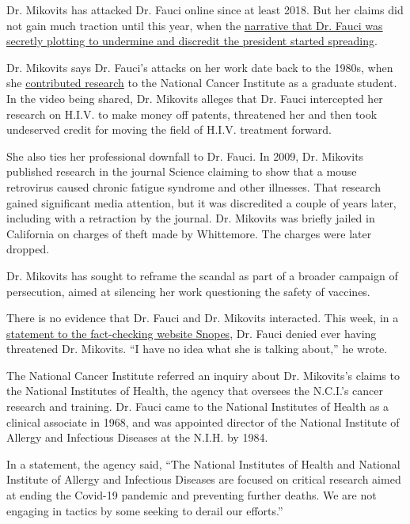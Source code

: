 Dr. Mikovits has attacked Dr. Fauci online since at least 2018. But her
claims did not gain much traction until this year, when the
\href{https://www.nytimes.com/2020/03/28/technology/coronavirus-fauci-trump-conspiracy-target.html}{narrative
that Dr. Fauci was secretly plotting to undermine and discredit the
president started spreading}.

Dr. Mikovits says Dr. Fauci's attacks on her work date back to the
1980s, when she
\href{https://nyaspubs.onlinelibrary.wiley.com/doi/abs/10.1111/j.1749-6632.1990.tb16119.x}{contributed
research} to the National Cancer Institute as a graduate student. In the
video being shared, Dr. Mikovits alleges that Dr. Fauci intercepted her
research on H.I.V. to make money off patents, threatened her and then
took undeserved credit for moving the field of H.I.V. treatment forward.

She also ties her professional downfall to Dr. Fauci. In 2009, Dr.
Mikovits published research in the journal Science claiming to show that
a mouse retrovirus caused chronic fatigue syndrome and other illnesses.
That research gained significant media attention, but it was discredited
a couple of years later, including with a retraction by the journal. Dr.
Mikovits was briefly jailed in California on charges of theft made by
Whittemore. The charges were later dropped.

Dr. Mikovits has sought to reframe the scandal as part of a broader
campaign of persecution, aimed at silencing her work questioning the
safety of vaccines.

There is no evidence that Dr. Fauci and Dr. Mikovits interacted. This
week, in a
\href{https://www.snopes.com/fact-check/scientist-vaccine-jailed/}{statement
to the fact-checking website Snopes}, Dr. Fauci denied ever having
threatened Dr. Mikovits. ``I have no idea what she is talking about,''
he wrote.

The National Cancer Institute referred an inquiry about Dr. Mikovits's
claims to the National Institutes of Health, the agency that oversees
the N.C.I.'s cancer research and training. Dr. Fauci came to the
National Institutes of Health as a clinical associate in 1968, and was
appointed director of the National Institute of Allergy and Infectious
Diseases at the N.I.H. by 1984.

In a statement, the agency said, ``The National Institutes of Health and
National Institute of Allergy and Infectious Diseases are focused on
critical research aimed at ending the Covid-19 pandemic and preventing
further deaths. We are not engaging in tactics by some seeking to derail
our efforts.''

